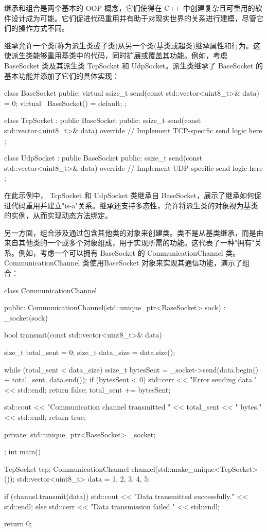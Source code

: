 
继承和组合是两个基本的 OOP 概念，它们使得在 C++ 中创建复杂且可重用的软件设计成为可能。它们促进代码重用并有助于对现实世界的关系进行建模，尽管它们的操作方式不同。

继承允许一个类(称为派生类或子类)从另一个类(基类或超类)继承属性和行为。这使派生类能够重用基类中的代码，同时扩展或覆盖其功能。例如，考虑 BaseSocket 类及其派生类 TcpSocket 和 UdpSocket。派生类继承了 BaseSocket 的基本功能并添加了它们的具体实现：

\begin{cpp}
class BaseSocket {
public:
    virtual ssize_t send(const std::vector<uint8_t>& data) = 0;
    virtual ~BaseSocket() = default;
};

class TcpSocket : public BaseSocket {
public:
    ssize_t send(const std::vector<uint8_t>& data) override {
        // Implement TCP-specific send logic here
    }
};

class UdpSocket : public BaseSocket {
public:
    ssize_t send(const std::vector<uint8_t>& data) override {
        // Implement UDP-specific send logic here
    }
};
\end{cpp}

在此示例中， TcpSocket 和 UdpSocket 类继承自 BaseSocket，展示了继承如何促进代码重用并建立"is-a"关系。继承还支持多态性，允许将派生类的对象视为基类的实例，从而实现动态方法绑定。

另一方面，组合涉及通过包含其他类的对象来创建类。类不是从基类继承，而是由来自其他类的一个或多个对象组成，用于实现所需的功能。这代表了一种"拥有"关系。例如，考虑一个可以拥有 BaseSocket 的 CommunicationChannel 类。 CommunicationChannel 类使用BaseSocket 对象来实现其通信功能，演示了组合：

\begin{cpp}
class CommunicationChannel {
    public:
    CommunicationChannel(std::unique_ptr<BaseSocket> sock) : _socket(sock) {}

    bool transmit(const std::vector<uint8_t>& data) {
        size_t total_sent = 0;
        size_t data_size = data.size();

        while (total_sent < data_size) {
            ssize_t bytesSent = _socket->send({data.begin() + total_sent, data.end()});
            if (bytesSent < 0) {
                std::cerr << "Error sending data." << std::endl;
                return false;
            }
            total_sent += bytesSent;
        }

        std::cout << "Communication channel transmitted " << total_sent << " bytes." << std::endl;
        return true;
    }
private:
    std::unique_ptr<BaseSocket> _socket;
};
int main() {
    TcpSocket tcp;
    CommunicationChannel channel(std::make_unique<TcpSocket>());
    std::vector<uint8_t> data = {1, 2, 3, 4, 5};

    if (channel.transmit(data)) {
        std::cout << "Data transmitted successfully." << std::endl;
    } else {
        std::cerr << "Data transmission failed." << std::endl;
    }

    return 0;
}
\end{cpp}


